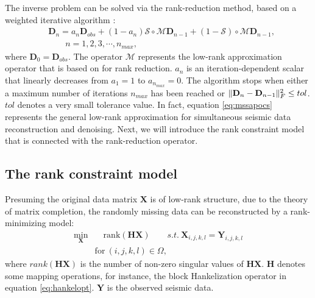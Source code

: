 The inverse problem can be solved via the rank-reduction method, based on a weighted iterative algorithm \cite{oropezamssa,gaomssa}:
\begin{equation}
\label{eq:mssapocs}
\begin{split}
&\mathbf{D}_n=a_n \mathbf{D}_{obs} + (1-a_n) \mathcal{S}\circ \mathcal{M} \mathbf{D}_{n-1} + (1-\mathcal{S}) \circ\mathcal{M}\mathbf{D}_{n-1},\\
&\qquad n=1,2,3,\cdots,n_{max},
\end{split}
\end{equation}
where $\mathbf{D}_0=\mathbf{D}_{obs}$. The operator $\mathcal{M}$ represents the low-rank approximation operator that is based on  for rank reduction.  $a_n$ is an iteration-dependent scalar that linearly decreases from $a_1=1$ to $a_{n_{max}}=0$.  The algorithm stops when either a maximum number of iterations $n_{max}$ has been reached or $\Arrowvert \mathbf{D}_n - \mathbf{D}_{n-1}\Arrowvert_F^2 \leq tol$. $tol$ denotes a very small tolerance value. In fact, equation \ref{eq:mssapocs} represents the general low-rank approximation for simultaneous seismic data reconstruction and denoising. Next, we will introduce the rank constraint model that is connected with the rank-reduction operator.

\subsection{The rank constraint model}
Presuming the original data matrix $\mathbf{X}$ is of low-rank structure, due to the theory of matrix completion, the randomly missing data can be reconstructed by a rank-minimizing model:
\begin{equation}
\label{eq:rank1}
\begin{split}
\min_{\mathbf{X}} & \quad \text{rank}(\mathbf{H} \mathbf{X}) \qquad s.t. \ \mathbf{X}_{i,j,k,l}=\mathbf{Y}_{i,j,k,l}\\
 & \text{for} \  (i,j,k,l) \in \Omega,
 \end{split}
\end{equation}
where $rank(\mathbf{H} \mathbf{X})$ is the number of non-zero singular values of $\mathbf{H} \mathbf{X}$. $\mathbf{H}$ denotes some mapping operations, for instance, the block Hankelization operator in equation \ref{eq:hankelopt}. $\mathbf{Y}$ is the observed seismic data. 

